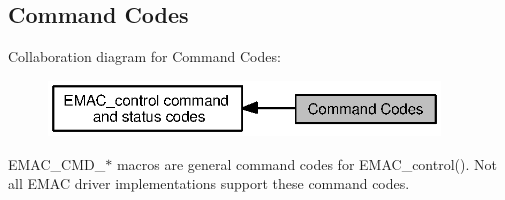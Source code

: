 \subsection{Command Codes}
\label{group___e_m_a_c___c_m_d}
Collaboration diagram for Command Codes\+:
\nopagebreak
\begin{figure}[H]
\begin{center}
\leavevmode
\includegraphics[width=295pt]{group___e_m_a_c___c_m_d}
\end{center}
\end{figure}
E\+M\+A\+C\+\_\+\+C\+M\+D\+\_\+$\ast$ macros are general command codes for E\+M\+A\+C\+\_\+control(). Not all E\+M\+A\+C driver implementations support these command codes. 